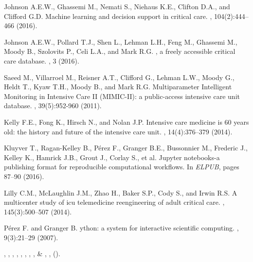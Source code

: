 \documentclass[english]{article}
\begin{document}
\begin{thebibliography}{1}
Johnson A.E.W., Ghassemi M., Nemati S., Niehaus K.E., Clifton D.A., and Clifford G.D.
\newblock Machine learning and decision support in critical care.
, 104(2):444--466 (2016).

Johnson A.E.W., Pollard T.J., Shen L., Lehman L.H., Feng M., Ghassemi M., Moody B., Szolovits P., Celi L.A., and Mark R.G.
, a freely accessible critical care database.
, 3 (2016).

Saeed M., Villarroel M., Reisner A.T., Clifford G., Lehman L.W., Moody G., Heldt T., Kyaw T.H., Moody B., and Mark R.G.
\newblock Multiparameter Intelligent Monitoring in Intensive Care {II} ({MIMIC-II}): a public-access intensive care unit database. , 39(5):952-960 (2011).

Kelly F.E., Fong K., Hirsch N., and Nolan J.P.
\newblock Intensive care medicine is 60 years old: the history and future of
  the intensive care unit.
, 14(4):376--379 (2014).

Kluyver T., Ragan-Kelley B., P{\'e}rez F., Granger B.E., Bussonnier M., Frederic J., Kelley K., Hamrick J.B., Grout J., Corlay S., et al.
\newblock Jupyter notebooks-a publishing format for reproducible computational
  workflows.
\newblock In {\em ELPUB}, pages 87--90 (2016).

Lilly C.M., McLaughlin J.M., Zhao H., Baker S.P., Cody S.,
  and Irwin R.S.
\newblock A multicenter study of icu telemedicine reengineering of adult
  critical care.
, 145(3):500--507 (2014).

P\'erez F. and Granger B.
ython: a system for interactive scientific computing.
, 9(3):21--29 (2007).

, ,
, ,
, ,
, ,
 \& ,
\newblock {}
\newblock \emph{}
  \textbf{}, 
  ().


\end{thebibliography}
\end{document}
